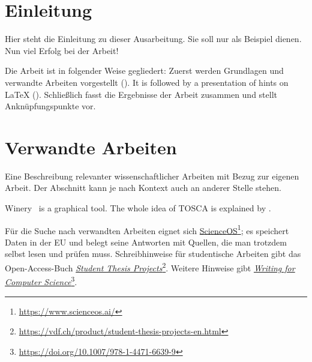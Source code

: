 

%
%

\maketitle

\begin{abstract}
\lipsum[1]

\end{abstract}


\section{Einleitung}
\label{sec:introduction}
Hier steht die Einleitung zu dieser Ausarbeitung.
Sie soll nur als Beispiel dienen.
Nun viel Erfolg bei der Arbeit!

Die Arbeit ist in folgender Weise gegliedert:
Zuerst werden Grundlagen und verwandte Arbeiten vorgestellt ().
It is followed by a presentation of hints on \LaTeX{} ().
Schließlich fasst  die Ergebnisse der Arbeit zusammen und stellt Anknüpfungspunkte vor.

\section{Verwandte Arbeiten}
\label{sec:relatedwork}

Eine Beschreibung relevanter wissenschaftlicher Arbeiten mit Bezug zur eigenen Arbeit.
Der Abschnitt kann je nach Kontext auch an anderer Stelle stehen.

Winery~\citep{Winery} is a graphical  tool.
The whole idea of TOSCA is explained by \citet{Binz2009}.

Für die Suche nach verwandten Arbeiten eignet sich \href{https://www.scienceos.ai/}{ScienceOS}\footnote{\url{https://www.scienceos.ai/}}; es speichert Daten in der EU und belegt seine Antworten mit Quellen, die man trotzdem selbst lesen und prüfen muss.
Schreibhinweise für studentische Arbeiten gibt das Open-Access-Buch \href{https://vdf.ch/product/student-thesis-projects-en.html}{\emph{Student Thesis Projects}}\footnote{\url{https://vdf.ch/product/student-thesis-projects-en.html}}.
Weitere Hinweise gibt \href{https://doi.org/10.1007/978-1-4471-6639-9}{\emph{Writing for Computer Science}}\footnote{\url{https://doi.org/10.1007/978-1-4471-6639-9}}.

